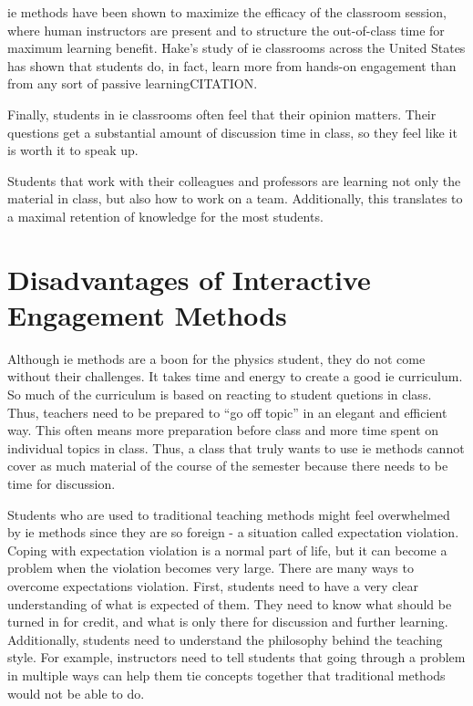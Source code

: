 \gls{ie} methods have been shown to maximize the efficacy of the classroom session, where human instructors are present and to structure the out-of-class time for maximum learning benefit. Hake's study of \gls{ie} classrooms across the United States has shown that students do, in fact, learn more from hands-on engagement than from any sort of passive learningCITATION.

Finally, students in \gls{ie} classrooms often feel that their opinion matters. Their questions get a substantial amount of discussion time in class, so they feel like it is worth it to speak up.



Students that work with their colleagues and professors are learning not only the material in class, but also how to work on a team. Additionally, this translates to a maximal retention of knowledge for the most students\cite{novak1999}.

\section{Disadvantages of Interactive Engagement Methods}

Although \gls{ie} methods are a boon for the physics student, they do not come without their challenges. It takes time and energy to create a good \gls{ie} curriculum. So much of the curriculum is based on reacting to student quetions in class. Thus, teachers need to be prepared to ``go off topic'' in an elegant and efficient way. This often means more preparation before class and more time spent on individual topics in class. Thus, a class that truly wants to use \gls{ie} methods cannot cover as much material of the course of the semester because there needs to be time for discussion.

Students who are used to traditional teaching methods might feel overwhelmed by \gls{ie} methods since they are so foreign - a situation called expectation violation. Coping with expectation violation is a normal part of life, but it can become a problem when the violation becomes very large. There are many ways to overcome expectations violation. First, students need to have a very clear understanding of what is expected of them. They need to know what should be turned in for credit, and what is only there for discussion and further learning. Additionally, students need to understand the philosophy behind the teaching style. For example, instructors need to tell students that going through a problem in multiple ways can help them tie concepts together that traditional methods would not be able to do.

